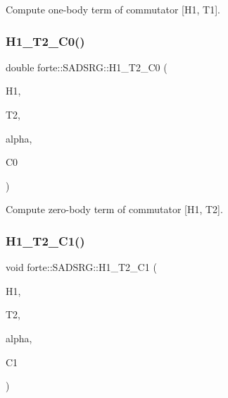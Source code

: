 Compute one-\/body term of commutator \mbox{[}H1, T1\mbox{]}. 

\mbox{\label{classforte_1_1_s_a_d_s_r_g_ab9ba2f9f724835ca7817b4fe0ebdccf0}} 
\subsubsection{\texorpdfstring{H1\+\_\+\+T2\+\_\+\+C0()}{H1\_T2\_C0()}}
{\footnotesize\ttfamily double forte\+::\+S\+A\+D\+S\+R\+G\+::\+H1\+\_\+\+T2\+\_\+\+C0 (\begin{DoxyParamCaption}\item[{Blocked\+Tensor \&}]{H1,  }\item[{Blocked\+Tensor \&}]{T2,  }\item[{const double \&}]{alpha,  }\item[{double \&}]{C0 }\end{DoxyParamCaption})\hspace{0.3cm}{\ttfamily [protected]}}



Compute zero-\/body term of commutator \mbox{[}H1, T2\mbox{]}. 

\mbox{\label{classforte_1_1_s_a_d_s_r_g_a4edfd97c6a6a5a68c1251cc4e1611e1b}} 
\subsubsection{\texorpdfstring{H1\+\_\+\+T2\+\_\+\+C1()}{H1\_T2\_C1()}}
{\footnotesize\ttfamily void forte\+::\+S\+A\+D\+S\+R\+G\+::\+H1\+\_\+\+T2\+\_\+\+C1 (\begin{DoxyParamCaption}\item[{Blocked\+Tensor \&}]{H1,  }\item[{Blocked\+Tensor \&}]{T2,  }\item[{const double \&}]{alpha,  }\item[{Blocked\+Tensor \&}]{C1 }\end{DoxyParamCaption})\hspace{0.3cm}{\ttfamily [protected]}}



